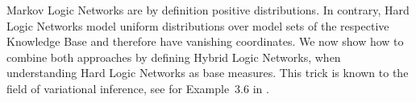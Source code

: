 %
%




\label{sec:hybridNetworks}

Markov Logic Networks are by definition positive distributions.
In contrary, Hard Logic Networks model uniform distributions over model sets of the respective Knowledge Base and therefore have vanishing coordinates.
We now show how to combine both approaches by defining Hybrid Logic Networks, when understanding Hard Logic Networks as base measures.
This trick is known to the field of variational inference, see for Example~3.6 in \cite{wainwright_graphical_2008}. 

